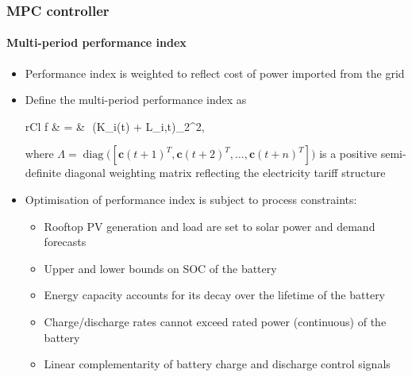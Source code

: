 \documentclass[presentation, smaller, xcolor=table]{beamer}
\newcommand{\sqrts}[2][]{\,\sqrt[#1]{#2}\,}
\begin{document}
\begin{frame}
	\frametitle{MPC controller}
	\framesubtitle{Multi-period performance index}

	\begin{itemize}
		\item  Performance index is weighted to reflect cost of power imported from the grid
		\item  Define the multi-period performance index as
		\begin{IEEEeqnarray*}{rCl}
				f & = & \left\lVert\sqrts{\Lambda}\big(K_{i}(t) + L_{i,t}\big)\right\rVert_{2}^{2},
		\end{IEEEeqnarray*}
		where $\Lambda = \operatorname{diag}\big([\boldsymbol{c}(t\!+\!1)^{T}, \boldsymbol{c}(t\!+\!2)^{T}, \ldots, \boldsymbol{c}(t\!+\!n)^{T}]\big)$ is a positive semi-definite diagonal weighting matrix reflecting the electricity tariff structure
		
		\item  Optimisation of performance index is subject to process constraints:
		\begin{itemize}
			\item  Rooftop PV generation and load are set to solar power and demand forecasts%
			\item  Upper and lower bounds on SOC of the battery%
			\item  Energy capacity accounts for its decay over the lifetime of the battery
			\item  Charge/discharge rates cannot exceed rated power (continuous) of the battery
			\item  Linear complementarity of battery charge and discharge control signals
		\end{itemize}
		
	\end{itemize}

\end{frame}
\end{document}
